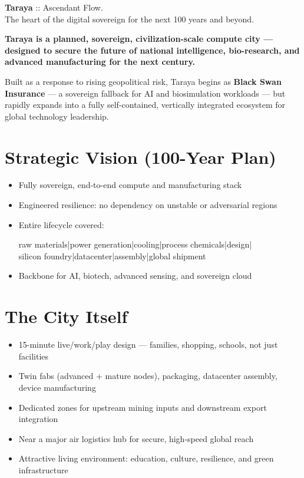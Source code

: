 \documentclass[12pt]{article}
\begin{document}
\begin{center}
    {\huge \textbf{Taraya}} {\Large :: Ascendant Flow.}\\[0.5em]
    {\Large The heart of the digital sovereign for the next 100 years and beyond.}\\[2em]
\end{center}

\begin{spacing}{1.15}

\noindent
\textbf{Taraya is a planned, sovereign, civilization-scale compute city — designed to secure the future of national intelligence, bio-research, and advanced manufacturing for the next century.}

\vspace{1em}
\noindent
Built as a response to rising geopolitical risk, Taraya begins as \textbf{Black Swan Insurance} — a sovereign fallback for AI and biosimulation workloads — but rapidly expands into a fully self-contained, vertically integrated ecosystem for global technology leadership.

\section*{Strategic Vision (100-Year Plan)}
\begin{itemize}
  \item Fully sovereign, end-to-end compute and manufacturing stack
  \item Engineered resilience: no dependency on unstable or adversarial regions
  \item Entire lifecycle covered:
      \begin{center}
        raw materials|power generation|cooling|process chemicals|design| \\
        silicon foundry|datacenter|assembly|global shipment
      \end{center}
  \item Backbone for AI, biotech, advanced sensing, and sovereign cloud
\end{itemize}

\section*{The City Itself}
\begin{itemize}
  \item 15-minute live/work/play design — families, shopping, schools, not just facilities
  \item Twin fabs (advanced + mature nodes), packaging, datacenter assembly, device manufacturing
  \item Dedicated zones for upstream mining inputs and downstream export integration
  \item Near a major air logistics hub for secure, high-speed global reach
  \item Attractive living environment: education, culture, resilience, and green infrastructure
\end{itemize}



\end{spacing}
\end{document}
